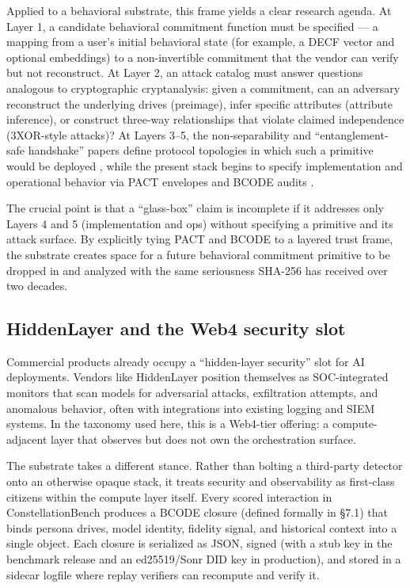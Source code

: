 \documentclass{article}
\begin{document}
Applied to a behavioral substrate, this frame yields a clear research
agenda. At Layer 1, a candidate behavioral commitment function must be
specified --- a mapping from a user's initial behavioral state (for
example, a DECF vector and optional embeddings) to a non-invertible
commitment that the vendor can verify but not reconstruct. At Layer 2,
an attack catalog must answer questions analogous to cryptographic
cryptanalysis: given a commitment, can an adversary reconstruct the
underlying drives (preimage), infer specific attributes (attribute
inference), or construct three-way relationships that violate claimed
independence (3XOR-style attacks)? At Layers 3--5, the non-separability
and ``entanglement-safe handshake'' papers define protocol topologies in
which such a primitive would be deployed
\citep{wp2_entanglement_safe_handshake}, while the present stack begins
to specify implementation and operational behavior via PACT envelopes
and BCODE audits \citep{pact_protocol_spec}.

The crucial point is that a ``glass-box'' claim is incomplete if it
addresses only Layers 4 and 5 (implementation and ops) without
specifying a primitive and its attack surface. By explicitly tying PACT
and BCODE to a layered trust frame, the substrate creates space for a
future behavioral commitment primitive to be dropped in and analyzed
with the same seriousness SHA-256 has received over two decades.

\subsection{HiddenLayer and the Web4 security
slot}\label{hiddenlayer-and-the-web4-security-slot}

Commercial products already occupy a ``hidden-layer security'' slot for
AI deployments. Vendors like HiddenLayer \citep{hiddenlayer} position
themselves as SOC-integrated monitors that scan models for adversarial
attacks, exfiltration attempts, and anomalous behavior, often with
integrations into existing logging and SIEM systems. In the taxonomy
used here, this is a Web4-tier offering: a compute-adjacent layer that
observes but does not own the orchestration surface.

The substrate takes a different stance. Rather than bolting a
third-party detector onto an otherwise opaque stack, it treats security
and observability as first-class citizens within the compute layer
itself. Every scored interaction in ConstellationBench produces a BCODE
closure (defined formally in §7.1) that binds persona drives, model
identity, fidelity signal, and historical context into a single object.
Each closure is serialized as JSON, signed (with a stub key in the
benchmark release and an ed25519/Sonr DID key in production), and stored
in a sidecar logfile where replay verifiers can recompute and verify it.
\end{document}
